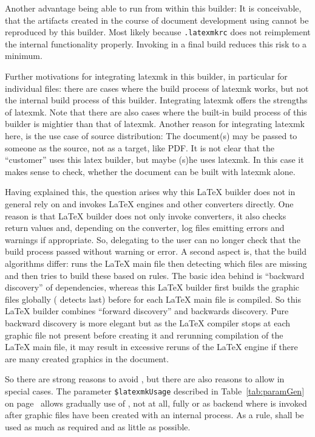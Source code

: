 Another advantage being able to run  from within this builder: 
It is conceivable, that the artifacts created in the course of document development 
using  cannot be reproduced by this builder. 
Most likely because \texttt{.latexmkrc} does not reimplement the internal functionality properly. 
Invoking  in a final build reduces this risk to a minimum. 

Further motivations for integrating latexmk in this builder, 
in particular for individual files: 
there are cases where the build process of latexmk works, 
but not the internal build process of this builder. 
Integrating latexmk offers the strengths of latexmk. 
Note that there are also cases 
where the built-in build process of this builder 
is mightier than that of latexmk. 
Another reason for integrating latexmk here, 
is the use case of source distribution: 
The document(s) may be passed to someone as the source, %
not as a target, like PDF\@. 
It is not clear that the ``customer'' uses this latex builder, 
but maybe (s)he uses latexmk. %
In this case it makes sense to check, 
whether the document can be built with latexmk alone. 

Having explained this, the question arises 
why this \LaTeX{} builder does not in general rely on  
and invokes \LaTeX{} engines and other converters directly. 
One reason is that \LaTeX{} builder does not only invoke converters, 
it also checks return values and, depending on the converter, 
log files emitting errors and warnings if appropriate. 
So, delegating to  
the user can no longer check that the build process passed without warning or error. 
A second aspect is, that the build algorithms differ: 
 runs the \LaTeX{} main file then detecting which files are missing 
and then tries to build these based on rules. 
The basic idea behind is ``backward discovery'' of dependencies, 
whereas this \LaTeX{} builder first builds the graphic files globally 
( detects last) 
before for each \LaTeX{} main file is compiled. 
So this \LaTeX{} builder combines ``forward discovery'' and backwards discovery. 
Pure backward discovery is more elegant 
but as the \LaTeX{} compiler stops at each graphic file not present 
before creating it and rerunning compilation of the \LaTeX{} main file, 
it may result in excessive reruns of the \LaTeX{} engine 
if there are many created graphics in the document. 

So there are strong reasons to avoid , 
but there are also reasons to allow in special cases. 
The parameter \texttt{\$latexmkUsage} described in Table~\ref{tab:paramGen} 
on page~\pageref{tab:paramGen} allows gradually use of , 
not at all, fully or as backend where  is invoked 
after graphic files have been created with an internal process. 
As a rule,  shall be used as much as required and as little as possible. 


